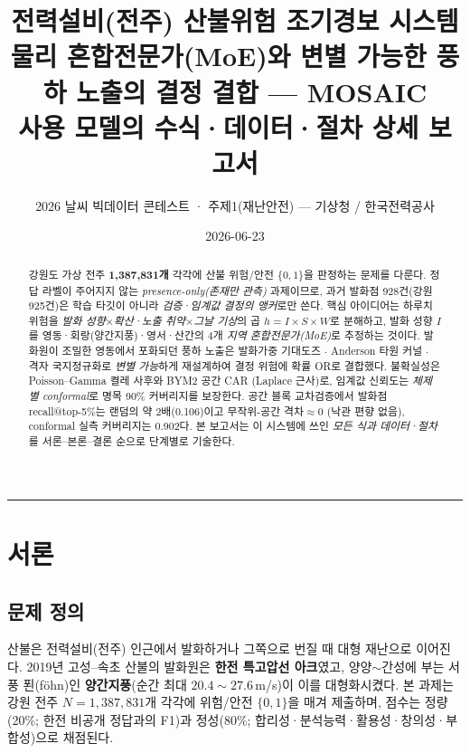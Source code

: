 \documentclass[11pt,a4paper]{article}
\title{\vspace{-1.0cm}\textbf{전력설비(전주) 산불위험 조기경보 시스템}\\[4pt]
\large 물리 혼합전문가(MoE)와 변별 가능한 풍하 노출의 결정 결합 --- \textbf{MOSAIC}\\[6pt]
\normalsize 사용 모델의 수식·데이터·절차 상세 보고서}
\author{\normalsize 2026 날씨 빅데이터 콘테스트 · 주제1(재난안전) — 기상청 / 한국전력공사}
\date{\normalsize 2026-06-23}
\begin{document}
\maketitle

\begin{abstract}
\noindent
강원도 가상 전주 \textbf{1{,}387{,}831개} 각각에 산불 위험/안전 $\{0,1\}$을 판정하는 문제를
다룬다. 정답 라벨이 주어지지 않는 \emph{presence-only(존재만 관측)} 과제이므로, 과거 발화점
928건(강원 925건)은 학습 타깃이 아니라 \emph{검증·임계값 결정의 앵커}로만 쓴다. 핵심 아이디어는
하루치 위험을 \emph{발화 성향}$\times$\emph{확산·노출 취약}$\times$\emph{그날 기상}의 곱
$h=I\!\times\!S\!\times\!W$로 분해하고, 발화 성향 $I$를 영동·회랑(양간지풍)·영서·산간의 4개
\emph{지역 혼합전문가(MoE)}로 추정하는 것이다. 발화원이 조밀한 영동에서 포화되던 풍하 노출은
발화가중 기대도즈 $\cdot$ Anderson 타원 커널 $\cdot$ 격자 국지정규화로 \emph{변별 가능}하게
재설계하여 결정 위험에 확률 OR로 결합했다. 불확실성은 Poisson--Gamma 켤레 사후와 BYM2 공간 CAR
(Laplace 근사)로, 임계값 신뢰도는 \emph{체제별 conformal}로 명목 90\% 커버리지를 보장한다. 공간
블록 교차검증에서 발화점 recall@top-5\%는 랜덤의 약 2배(0.106)이고 무작위-공간 격차$\approx 0$
(낙관 편향 없음), conformal 실측 커버리지는 0.902다. 본 보고서는 이 시스템에 쓰인 \emph{모든 식과
데이터·절차}를 서론--본론--결론 순으로 단계별로 기술한다.
\end{abstract}

\tableofcontents
\vspace{6pt}\hrule

\section{서론}

\subsection{문제 정의}
산불은 전력설비(전주) 인근에서 발화하거나 그쪽으로 번질 때 대형 재난으로 이어진다.
2019년 고성--속초 산불의 발화원은 \textbf{한전 특고압선 아크}였고, 양양$\sim$간성에 부는 서풍
푄(föhn)인 \textbf{양간지풍}(순간 최대 $20.4\sim27.6$\,m/s)이 이를 대형화시켰다. 본 과제는 강원
전주 $N=1{,}387{,}831$개 각각에 위험/안전 $\{0,1\}$을 매겨 제출하며, 점수는 정량(20\%; 한전
비공개 정답과의 F1)과 정성(80\%; 합리성·분석능력·활용성·창의성·부합성)으로 채점된다.
\end{document}
